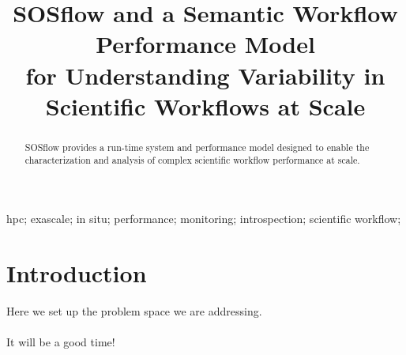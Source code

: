 




\title{SOSflow and a Semantic Workflow Performance Model\\
    for Understanding Variability in Scientific Workflows at Scale
 }

\author{
}


\maketitle


\begin{abstract}
SOSflow provides a run-time system and performance model designed to enable the 
characterization and analysis of complex scientific workflow performance at scale.


\end{abstract}

\begin{IEEEkeywords}
hpc; exascale; in situ; performance; monitoring; introspection; scientific 
workflow;

\end{IEEEkeywords}


\IEEEpeerreviewmaketitle


\section{Introduction}
Here we set up the problem space we are addressing.\\
\\
It will be a good time!\\
\\


